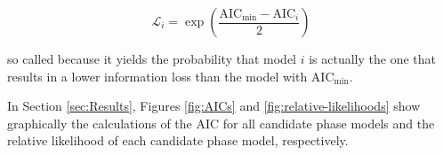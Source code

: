 \begin{equation}
    \mathcal{L}_i = \exp{\left(
      \frac{\mathrm{AIC}_{\mathrm{min}} - \mathrm{AIC}_{i}}{2} 
      \right)
      }
  \label{eq:relative-likelihood}
\end{equation}

\noindent
so called because it yields the probability that model $i$ is actually the one
that results in a lower information loss than the model with AIC$_{\mathrm{min}}$.


In Section \ref{sec:Results}, Figures \ref{fig:AICs} and \ref{fig:relative-likelihoods}
show graphically the calculations of the AIC for all candidate phase
models and the relative likelihood of each candidate phase model, respectively.
